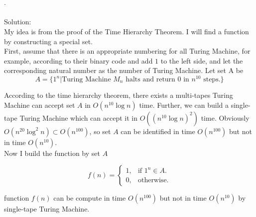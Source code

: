 \documentclass[a4papper]{article}
\theoremstyle{neosn}
\begin{document}
    \\
    \\

    .\\

    \\
    Solution: \\

    My idea is from the proof of the Time Hierarchy Theorem.
    I will find a function by constructing a special set. \\

    First, assume that there is an appropriate numbering for all Turing Machine,
    for example, according to their binary code and add $1$ to the left side, and let the corresponding
    natural number as the number of Turing Machine.
    Let set A be
    \[
        A = \{1^n | \text{Turing Machine } M_n \text{ halts and return 0 in } n^{10} \text{ steps}.\}
    \]

    According to the time hierarchy theorem, there exists a multi-tapes Turing Machine can accept set
    $A$ in $O(n^{10} \log n)$ time.
    Further, we can build a single-tape Turing Machine which can accept it in $O((n^{10} \log n)^2)$ time.
    Obviously $O(n^{20} \log^2 n) \subset O(n^{100})$, so set $A$ can be identified in time $O(n^{100})$
    but not in time $O(n^{10})$. \\

    Now I build the function by set $A$

    \[
        f(n) =  \begin{cases}
                    1, & \text{if } 1^n \in A. \\
                    0, & \text{otherwise}.
                \end{cases}
    \]

    function $f(n)$ can be compute in time $O(n^{100})$ but not in time $O(n^{10})$ by single-tape
    Turing Machine.
\end{document}
